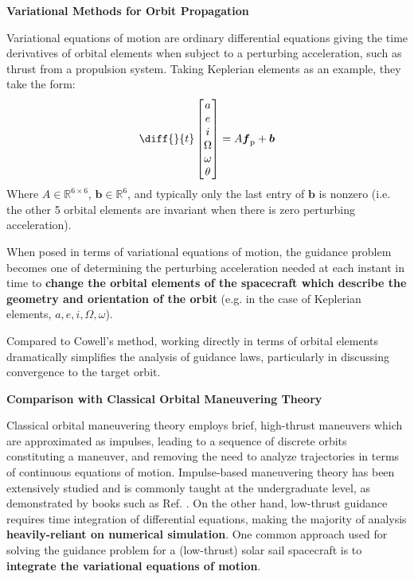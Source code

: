\textbf{Variational Methods for Orbit Propagation}

Variational equations of motion are ordinary differential equations giving the time derivatives of orbital elements when subject to a perturbing acceleration, such as thrust from a propulsion system. Taking Keplerian elements as an example, they take the form:
\begin{equation*}
    \diff{}{t}
    \begin{bmatrix}
        a\\e\\i\\ \Omega \\ \omega \\ \theta
    \end{bmatrix}
    = A \boldsymbol{f}_\mathrm{p} + \boldsymbol{b}
\end{equation*}
Where $A \in \mathbb{R}^{6\times6}$, $\boldsymbol{b} \in  \mathbb{R}^{6}$, and typically only the last entry of $\boldsymbol{b}$ is nonzero (i.e. the other 5 orbital elements are invariant when there is zero perturbing acceleration).

When posed in terms of variational equations of motion, the guidance problem becomes one of determining the perturbing acceleration needed at each instant in time to \textbf{change the orbital elements of the spacecraft which describe the geometry and orientation of the orbit} (e.g. in the case of Keplerian elements, $a, e, i , \Omega, \omega$).

Compared to Cowell's method, working directly in terms of orbital elements dramatically simplifies the analysis of guidance laws, particularly in discussing convergence to the target orbit.

\textbf{Comparison with Classical Orbital Maneuvering Theory}

Classical orbital maneuvering theory employs brief, high-thrust maneuvers which are approximated as impulses, leading to a sequence of discrete orbits constituting a maneuver, and removing the need to analyze trajectories in terms of continuous equations of motion. Impulse-based maneuvering theory has been extensively studied and is commonly taught at the undergraduate level, as demonstrated by books such as Ref. \cite{book:1487513}. On the other hand, low-thrust guidance requires time integration of differential equations, making the majority of analysis \textbf{heavily-reliant on numerical simulation}. One common approach used for solving the guidance problem for a (low-thrust) solar sail spacecraft is to \textbf{integrate the variational equations of motion}.

